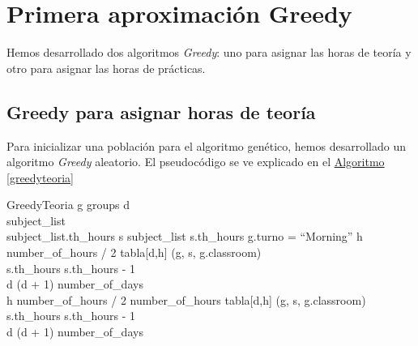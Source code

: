 \chapter{Primera aproximación Greedy}
Hemos desarrollado dos algoritmos \textit{Greedy}: uno para asignar las horas de teoría y otro para asignar las horas de prácticas.

\section{Greedy para asignar horas de teoría}
Para inicializar una población para el algoritmo genético, hemos desarrollado un algoritmo \textit{Greedy} aleatorio. El pseudocódigo se ve explicado en el \hyperref[greedyteoria]{Algoritmo \ref*{greedyteoria}} 

\begin{pseudocode}{GreedyTeoria}{ }
    \label{greedyteoria}
    \FOREACH g \in groups \DO
    \BEGIN
        d  \\
        subject\_list \GETS {}\\
        \WHILE \sum subject\_list.th\_hours  \DO
        \BEGIN
            \FOREACH s \in subject\_list \DO
            \BEGIN
                \IF s.th\_hours  \DO
                \BEGIN
                    \IF g.turno = ``Morning'' \DO
                    \BEGIN
                        \FOR h  \TO number\_of\_hours / 2 \DO
                        \BEGIN
                            \IF {} \DO
                            \BEGIN
                                tabla[d,h] \GETS (g, s, g.classroom)\\
                                s.th\_hours \GETS s.th\_hours - 1\\
                                d \GETS (d + 1) \bmod number\_of\_days\\
                                \BREAK
                            \END
                        \END
                    \END
                    \ELSE \DO
                    \BEGIN
                        \FOR h \GETS number\_of\_hours / 2 \TO number\_of\_hours \DO
                        \BEGIN
                            \IF {} \DO
                            \BEGIN
                                tabla[d,h] \GETS (g, s, g.classroom)\\
                                s.th\_hours \GETS s.th\_hours - 1\\
                                d \GETS (d + 1) \bmod number\_of\_days\\
                                \BREAK
                            \END
                        \END
                    \END
                \END
            \END
        \END
    \END
\end{pseudocode}

